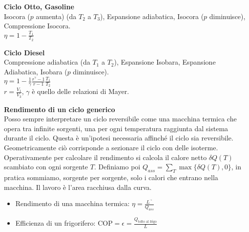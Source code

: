 \documentclass[10pt,a4paper]{article}
\newcommand{\Lusc}{{\ensuremath{L^{\vec{}}}}}
\begin{document}
\begin{multicols}{2}
\textbf{Ciclo Otto, Gasoline} \\
Isocora ($p$ aumenta) (da $T_2$ a $T_3$), Espansione adiabatica, Isocora ($p$ diminuisce), Compressione Isocora. \\
$\eta = 1- \frac{T_1}{T_2}$

\textbf{Ciclo Diesel} \\
Compressione adiabatica (da $T_1$ a $T_2$), Espansione Isobara, Espansione Adiabatica, Isobara ($p$ diminuisce). \\
$\eta= 1-\frac{1}{\gamma} \frac{r^\gamma -1}{r-1} \frac{T_1}{T_2}$ \\
$r=\frac{V_1}{V_3}$, $\gamma$ è quello delle relazioni di Mayer.


\textbf{Rendimento di un ciclo generico} \\
Posso sempre interpretare un ciclo reversibile come una macchina termica che opera tra infinite sorgenti, una per ogni temperatura raggiunta dal sistema durante il ciclo. Questa è un'ipotesi necessaria affinché il ciclo sia reversibile. 
Geometricamente ciò corrisponde a sezionare il ciclo con delle isoterme. 
Operativamente per calcolare il rendimento si calcola il calore netto $\delta Q(T)$ scambiato con ogni sorgente $T$. Definiamo poi $Q_{ass}=\sum_T \max\{ \delta Q(T), 0 \}$, in pratica sommiamo, sorgente per sorgente, solo i calori che entrano nella macchina.
Il lavoro è l'area racchiusa dalla curva.
  
  
  \begin{itemize}
  \item Rendimento di una macchina termica: $\eta = \frac{\Lusc}{Q_{ass}}$
  \item Efficienza di un frigorifero: $\mbox{COP}=\epsilon = \frac{Q_{\mbox{tolto al frigo}}}{L}$
  \end{itemize}


\end{multicols}
\end{document}
